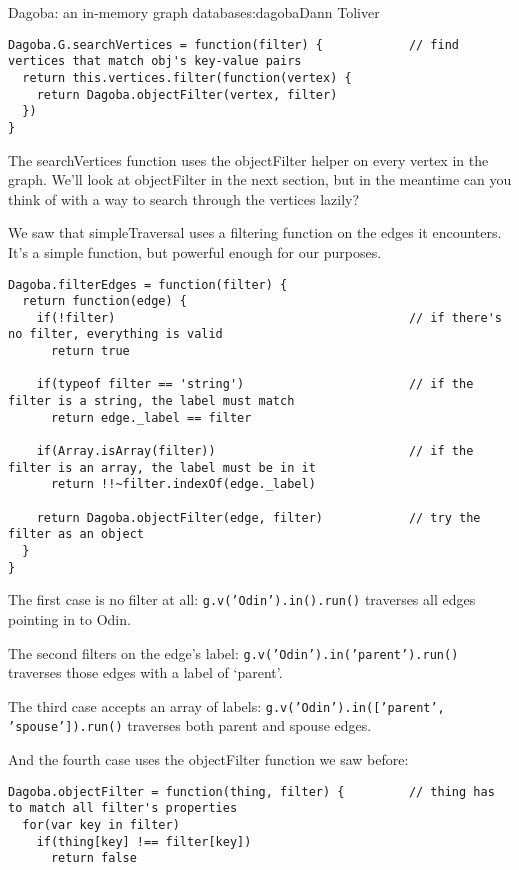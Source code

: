 \begin{aosachapter}{Dagoba: an in-memory graph database}{s:dagoba}{Dann Toliver}
\begin{verbatim}
Dagoba.G.searchVertices = function(filter) {            // find vertices that match obj's key-value pairs
  return this.vertices.filter(function(vertex) {
    return Dagoba.objectFilter(vertex, filter)
  })
}
\end{verbatim}

The searchVertices function uses the objectFilter helper on every vertex
in the graph. We'll look at objectFilter in the next section, but in the
meantime can you think of with a way to search through the vertices
lazily?

\label{filtering}

We saw that simpleTraversal uses a filtering function on the edges it
encounters. It's a simple function, but powerful enough for our
purposes.

\begin{verbatim}
Dagoba.filterEdges = function(filter) {
  return function(edge) {
    if(!filter)                                         // if there's no filter, everything is valid
      return true

    if(typeof filter == 'string')                       // if the filter is a string, the label must match
      return edge._label == filter

    if(Array.isArray(filter))                           // if the filter is an array, the label must be in it
      return !!~filter.indexOf(edge._label)

    return Dagoba.objectFilter(edge, filter)            // try the filter as an object
  }
}
\end{verbatim}

The first case is no filter at all: \texttt{g.v('Odin').in().run()}
traverses all edges pointing in to Odin.

The second filters on the edge's label:
\texttt{g.v('Odin').in('parent').run()} traverses those edges with a
label of `parent'.

The third case accepts an array of labels:
\texttt{g.v('Odin').in({[}'parent', 'spouse'{]}).run()} traverses both
parent and spouse edges.

And the fourth case uses the objectFilter function we saw before:

\begin{verbatim}
Dagoba.objectFilter = function(thing, filter) {         // thing has to match all filter's properties
  for(var key in filter)
    if(thing[key] !== filter[key])
      return false
  

\end{verbatim}
\end{aosachapter}
